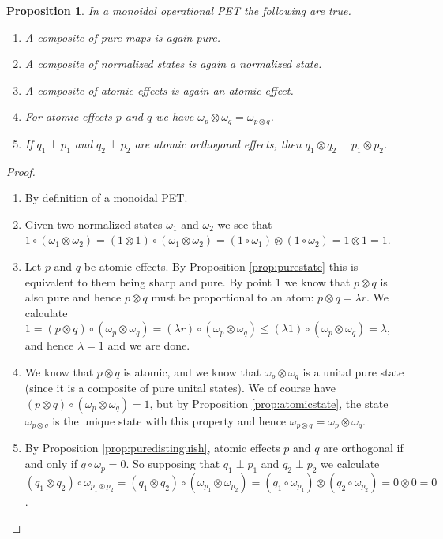 \documentclass[b5paper,onecolumn,12pt,accepted=2019-05-03, issue=1, volume=1, shorttitle=papers/compositionality-1-1]{compositionalityarticle}
\newcounter{counter}
\numberwithin{counter}{section}
\newtheorem{proposition}[counter]{Proposition}
\begin{document}
\begin{proposition} \label{prop:compositeproperties}
    In a monoidal operational PET the following are true.
    \begin{enumerate}
        \item A composite of pure maps is again pure.
        \item A composite of normalized states is again a normalized state.
        \item A composite of atomic effects is again an atomic effect.
        \item For atomic effects $p$ and $q$ we have $\omega_p\otimes \omega_q = \omega_{p\otimes q}$.
        \item If $q_1\perp p_1$ and $q_2\perp p_2$ are atomic orthogonal effects, then $q_1\otimes q_2 \perp p_1\otimes p_2$.
    \end{enumerate}
\end{proposition}
\begin{proof}~
    \begin{enumerate}
        \item By definition of a monoidal PET.
        \item Given two normalized states $\omega_1$ and $\omega_2$ we see that $1\circ(\omega_1\otimes \omega_2) = (1\otimes 1)\circ(\omega_1\otimes \omega_2) = (1\circ\omega_1) \otimes (1\circ \omega_2) = 1\otimes 1 = 1$.
        \item Let $p$ and $q$ be atomic effects. By Proposition \ref{prop:purestate} this is equivalent to them being sharp and pure. By point 1 we know that $p\otimes q$ is also pure and hence $p\otimes q$ must be proportional to an atom: $p\otimes q = \lambda r$. We calculate $1 = (p\otimes q)\circ (\omega_p\otimes \omega_q) = (\lambda r)\circ (\omega_p\otimes \omega_q) \leq (\lambda 1)\circ (\omega_p\otimes \omega_q) = \lambda$, and hence $\lambda=1$ and we are done.
        \item We know that $p\otimes q$ is atomic, and we know that $\omega_p\otimes \omega_q$ is a unital pure state (since it is a composite of pure unital states). We of course have $(p\otimes q)\circ (\omega_p\otimes \omega_q) = 1$, but by Proposition \ref{prop:atomicstate}, the state $\omega_{p\otimes q}$ is the unique state with this property and hence $\omega_{p\otimes q} = \omega_p\otimes \omega_q$.
        \item By Proposition \ref{prop:puredistinguish}, atomic effects $p$ and $q$ are orthogonal if and only if $q\circ \omega_p = 0$. So supposing that $q_1\perp p_1$ and $q_2\perp p_2$ we calculate $(q_1\otimes q_2)\circ\omega_{p_1\otimes p_2} = (q_1\otimes q_2)\circ (\omega_{p_1}\otimes \omega_{p_2}) = (q_1\circ \omega_{p_1})\otimes (q_2\circ \omega_{p_2}) = 0\otimes 0 = 0$. \qedhere
    \end{enumerate}
\end{proof}
\end{document}
